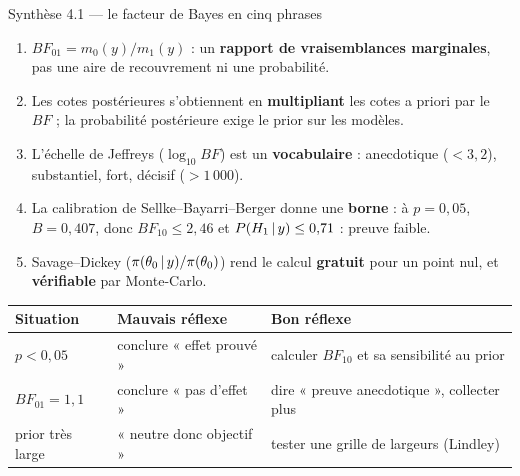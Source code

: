 \begin{frame}{Synthèse 4.1 --- le facteur de Bayes en cinq phrases}
\begin{kbox}[À retenir]
\begin{enumerate}
  \item $BF_{01} = m_0(y)/m_1(y)$ : un \textbf{rapport de vraisemblances marginales},
        pas une aire de recouvrement ni une probabilité.
  \item Les cotes postérieures s'obtiennent en \textbf{multipliant} les cotes a priori
        par le $BF$ ; la probabilité postérieure exige le prior sur les modèles.
  \item L'échelle de Jeffreys ($\log_{10} BF$) est un \textbf{vocabulaire} :
        anecdotique ($<3{,}2$), substantiel, fort, décisif ($>1\,000$).
  \item La calibration de Sellke--Bayarri--Berger donne une \textbf{borne} :
        à $p = 0{,}05$, $B = 0{,}407$, donc $BF_{10} \le 2{,}46$ et
        $P(H_1 \,\vert\, y) \le 0{,}71$ : preuve faible.
  \item Savage--Dickey ($\pi(\theta_0 \,\vert\, y)/\pi(\theta_0)$) rend le calcul
        \textbf{gratuit} pour un point nul, et \textbf{vérifiable} par Monte-Carlo.
\end{enumerate}
\end{kbox}
\vspace{1mm}
\begin{center}
\small
\begin{tabular}{@{}lll@{}}
\toprule
\textbf{Situation} & \textbf{Mauvais réflexe} & \textbf{Bon réflexe} \\
\midrule
$p < 0{,}05$ & conclure « effet prouvé » & calculer $BF_{10}$ et sa sensibilité au prior \\
$BF_{01} = 1{,}1$ & conclure « pas d'effet » & dire « preuve anecdotique », collecter plus \\
prior très large & « neutre donc objectif » & tester une grille de largeurs (Lindley) \\
\bottomrule
\end{tabular}
\end{center}
\end{frame}
